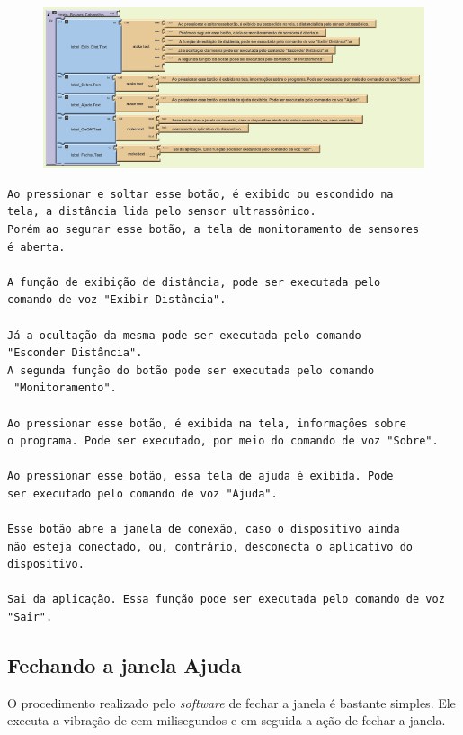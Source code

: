 \documentclass[portugues, brazil, a4paper,12pt]{article}
\begin{document}
\begin{figure}[H]
	\centering
	\includegraphics[scale=.8]{img/ajuda/bCabecalho.png}
	
\end{figure}
\begin{verbatim}
Ao pressionar e soltar esse botão, é exibido ou escondido na 
tela, a distância lida pelo sensor ultrassônico.
Porém ao segurar esse botão, a tela de monitoramento de sensores 
é aberta.

A função de exibição de distância, pode ser executada pelo 
comando de voz "Exibir Distância".

Já a ocultação da mesma pode ser executada pelo comando 
"Esconder Distância".
A segunda função do botão pode ser executada pelo comando
 "Monitoramento".

Ao pressionar esse botão, é exibida na tela, informações sobre 
o programa. Pode ser executado, por meio do comando de voz "Sobre".

Ao pressionar esse botão, essa tela de ajuda é exibida. Pode 
ser executado pelo comando de voz "Ajuda".

Esse botão abre a janela de conexão, caso o dispositivo ainda 
não esteja conectado, ou, contrário, desconecta o aplicativo do 
dispositivo.

Sai da aplicação. Essa função pode ser executada pelo comando de voz "Sair".

\end{verbatim}

\subsection{Fechando a janela Ajuda}
O procedimento realizado pelo \textit{software} de fechar a janela é bastante simples. Ele executa a vibração de cem milisegundos e em seguida a ação de fechar a janela.
\end{document}
